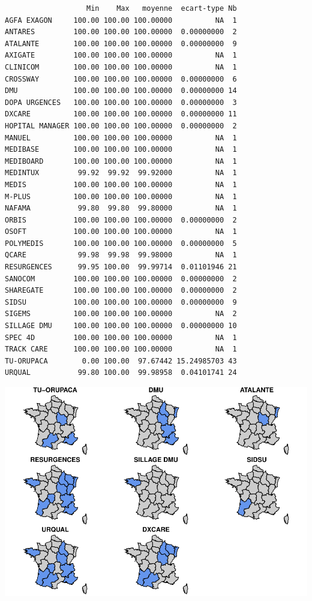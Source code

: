 \documentclass[]{article}
\begin{document}
\begin{verbatim}
                   Min    Max   moyenne  ecart-type Nb
AGFA EXAGON     100.00 100.00 100.00000          NA  1
ANTARES         100.00 100.00 100.00000  0.00000000  2
ATALANTE        100.00 100.00 100.00000  0.00000000  9
AXIGATE         100.00 100.00 100.00000          NA  1
CLINICOM        100.00 100.00 100.00000          NA  1
CROSSWAY        100.00 100.00 100.00000  0.00000000  6
DMU             100.00 100.00 100.00000  0.00000000 14
DOPA URGENCES   100.00 100.00 100.00000  0.00000000  3
DXCARE          100.00 100.00 100.00000  0.00000000 11
HOPITAL MANAGER 100.00 100.00 100.00000  0.00000000  2
MANUEL          100.00 100.00 100.00000          NA  1
MEDIBASE        100.00 100.00 100.00000          NA  1
MEDIBOARD       100.00 100.00 100.00000          NA  1
MEDINTUX         99.92  99.92  99.92000          NA  1
MEDIS           100.00 100.00 100.00000          NA  1
M-PLUS          100.00 100.00 100.00000          NA  1
NAFAMA           99.80  99.80  99.80000          NA  1
ORBIS           100.00 100.00 100.00000  0.00000000  2
OSOFT           100.00 100.00 100.00000          NA  1
POLYMEDIS       100.00 100.00 100.00000  0.00000000  5
QCARE            99.98  99.98  99.98000          NA  1
RESURGENCES      99.95 100.00  99.99714  0.01101946 21
SANOCOM         100.00 100.00 100.00000  0.00000000  2
SHAREGATE       100.00 100.00 100.00000  0.00000000  2
SIDSU           100.00 100.00 100.00000  0.00000000  9
SIGEMS          100.00 100.00 100.00000          NA  2
SILLAGE DMU     100.00 100.00 100.00000  0.00000000 10
SPEC 4D         100.00 100.00 100.00000          NA  1
TRACK CARE      100.00 100.00 100.00000          NA  1
TU-ORUPACA        0.00 100.00  97.67442 15.24985703 43
URQUAL           99.80 100.00  99.98958  0.04101741 24
\end{verbatim}

\includegraphics{septembre2015_files/figure-latex/unnamed-chunk-13-1.pdf}
\end{document}
